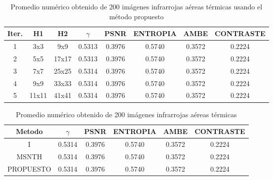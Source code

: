 \documentclass[a4paper, 11 pt, conference]{ieeeconf}      %
\begin{document}
\begin{table}[h]
\centering
\tiny
\caption{Promedio num\'erico obtenido de 200 im\'agenes infrarrojas a\'ereas t\'ermicas usando el m\'etodo propuesto}
\label{tabla_3}
\begin{center}
\begin{tabular}{ c c c c c c c c }
\hline
\textbf{Iter.} & \textbf{H1} & \textbf{H2} & \textbf{$\gamma$} & \textbf{PSNR} & \textbf{ENTROPIA} & \textbf{AMBE} & \textbf{CONTRASTE} \\
\hline
1 & 3x3 & 9x9 & 0.5313 & 0.3976 & 0.5740 & 0.3572 & 0.2224 \\
2 & 5x5 & 17x17 & 0.5313 & 0.3976 & 0.5740 & 0.3572 & 0.2224 \\
3 & 7x7 & 25x25 & 0.5314 & 0.3976 & 0.5740 & 0.3572 & 0.2224 \\
4 & 9x9 & 33x33 & 0.5314 & 0.3976 & 0.5740 & 0.3572 & 0.2224 \\
5 & 11x11 & 41x41 & 0.5314 & 0.3976 & 0.5740 & 0.3572 & 0.2224 \\
\hline
\end{tabular}
\end{center}
\end{table}
\normalsize

\begin{table}[h]
\centering
\tiny
\caption{Promedio num\'erico obtenido de 200 im\'agenes infrarrojas a\'ereas t\'ermicas}
\label{tabla_4}
\begin{center}
\begin{tabular}{ c c c c c c }
\hline
\textbf{Metodo} & \textbf{$\gamma$} & \textbf{PSNR} & \textbf{ENTROPIA} & \textbf{AMBE} & \textbf{CONTRASTE} \\
\hline
I & 0.5314 & 0.3976 & 0.5740 & 0.3572 & 0.2224 \\
MSNTH & 0.5314 & 0.3976 & 0.5740 & 0.3572 & 0.2224 \\
PROPUESTO & 0.5314 & 0.3976 & 0.5740 & 0.3572 & 0.2224 \\
\hline
\end{tabular}
\end{center}
\end{table}
\normalsize
\end{document}

